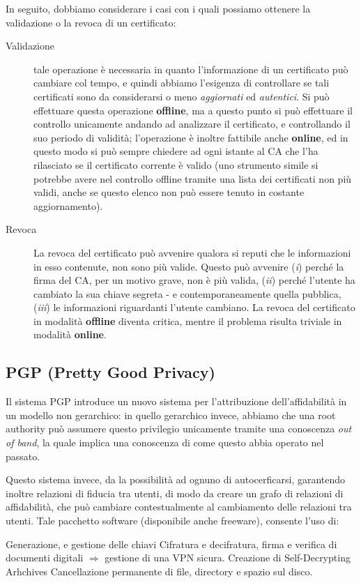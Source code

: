 In seguito, dobbiamo considerare i casi con i quali possiamo ottenere la validazione
o la revoca di un certificato:
\begin{description}
\item [Validazione] tale operazione è necessaria in quanto l'informazione di un 
	certificato può cambiare col tempo, e quindi abbiamo l'esigenza di 
	controllare se tali certificati sono da considerarsi o meno \textit{aggiornati}
	ed \textit{autentici}. Si può effettuare questa operazione \textbf{offline}, ma a questo
	punto si può effettuare il controllo unicamente andando ad analizzare 
	il certificato, e controllando il suo periodo di validità; l'operazione
	è inoltre fattibile anche \textbf{online}, ed in questo modo si può sempre 
	chiedere ad ogni istante al CA che l'ha rilasciato se il certificato 
	corrente è valido (uno strumento simile si potrebbe avere nel controllo
	offline tramite una lista dei certificati non più validi, anche se questo
	elenco non può essere tenuto in costante aggiornamento).
\item [Revoca] La revoca del certificato può avvenire qualora si reputi che 
	le informazioni in esso contenute, non sono più valide. Questo può avvenire
	(\emph{i}) perché la firma del CA, per un motivo grave, non è più valida,
	(\emph{ii}) perché l'utente ha cambiato la sua chiave segreta - e
	contemporaneamente quella pubblica, (\emph{iii}) le informazioni riguardanti
	l'utente cambiano. La revoca del certificato in modalità \textbf{offline}
	diventa critica, mentre il problema risulta triviale in modalità
	\textbf{online}. 
\end{description}

\subsection{PGP (Pretty Good Privacy)}
Il sistema PGP introduce un nuovo sistema per l'attribuzione dell'affidabilità
in un modello non gerarchico: in quello gerarchico invece, abbiamo che una root authority
può assumere questo privilegio unicamente tramite una conoscenza \textit{out of band},
la quale implica una conoscenza di come questo abbia operato nel passato.

Questo sistema invece, da la possibilità ad ognuno di autocerficarsi, garantendo
inoltre relazioni di fiducia tra utenti, di modo da creare un grafo di relazioni
di affidabilità, che può cambiare contestualmente al cambiamento delle relazioni
tra utenti. Tale pacchetto software (disponibile anche freeware), consente l'uso
di:
\begin{itemize}
\diam Generazione, e gestione delle chiavi
\diam Cifratura e decifratura, firma e verifica di documenti digitali
\diam $\Rightarrow$ gestione di una VPN sicura.
\diam Creazione di Self-Decrypting Arhchives
\diam Cancellazione permanente di file, directory e spazio sul disco.
\end{itemize}

